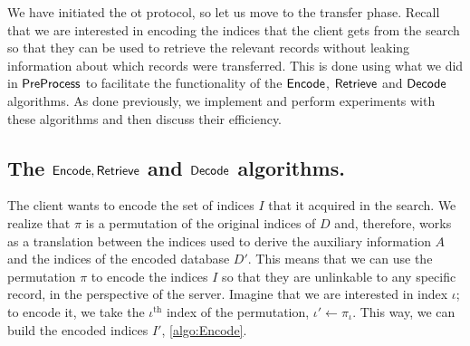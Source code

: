 We have initiated the \acrshort{ot} protocol, so let us move to the transfer phase. Recall that we are interested in encoding the indices that the client gets from the search so that they can be used to retrieve the relevant records without leaking information about which records were transferred. This is done using what we did in $ \mathsf{{PreProcess}} $ to facilitate the functionality of the $ \mathsf{{Encode}} $, $ \mathsf{{Retrieve}} $ and $ \mathsf{{Decode}} $ algorithms. As done previously, we implement and perform experiments with these algorithms and then discuss their efficiency.

\subsection*{\thesubsection\quad The $ \mathsf{{Encode}}, \mathsf{{Retrieve}} $ and $ \mathsf{{Decode}} $ algorithms. }\label{subsec:FileRetrieval}

The client wants to encode the set of indices $ I $ that it acquired in the search. We realize that $ \pi $ is a permutation of the original indices of $ D $ and, therefore, works as a translation between the indices used to derive the auxiliary information $ A $ and the indices of the encoded database $ D' $. This means that we can use the permutation $ \pi $ to encode the indices $ I $ so that they are unlinkable to any specific record, in the perspective of the server. Imagine that we are interested in index $ \iota $; to encode it, we take the $ \iota^{\text{th}}$ index of the permutation, $ \iota' \gets \pi_\iota $. This way, we can build the encoded indices $ I' $, \cref{algo:Encode}.

\hfill

